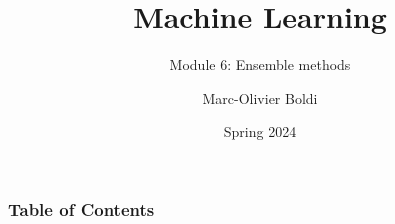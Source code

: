 
\title{Machine Learning}
\subtitle{Module 6: Ensemble methods}
\author[MOB]{Marc-Olivier Boldi}
\date[Spring 2024]{Spring 2024}

\begin{frame}
  \titlepage
\end{frame}
\begin{frame}
\frametitle{Table of Contents}
	\tableofcontents
\end{frame}
